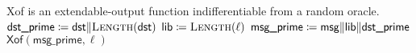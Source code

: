\begin{algorithm}[t]
\caption{\ExpandMsgXof{}}
\label{alg:expand_message_xof}
\begin{algorithmic}[1]
\Require \textsf{Xof} is an extendable-output function
    indifferentiable from a random oracle.
    \State $\textsf{dst\_prime} \coloneqq{} \textsf{dst} \|
            \textsc{Length}(\textsf{dst})$
    \State $\textsf{lib} \coloneqq{}
        \textsc{Length}(\ell)$
    \State $\textsf{msg\_prime} \coloneqq{} 
        \textsf{msg}\|
        \textsf{lib}\|
        \textsf{dst\_prime}$
    \State \Return $\textsf{Xof}(\textsf{msg\_prime}, \ell)$
\EndProcedure
\end{algorithmic}
\end{algorithm}
